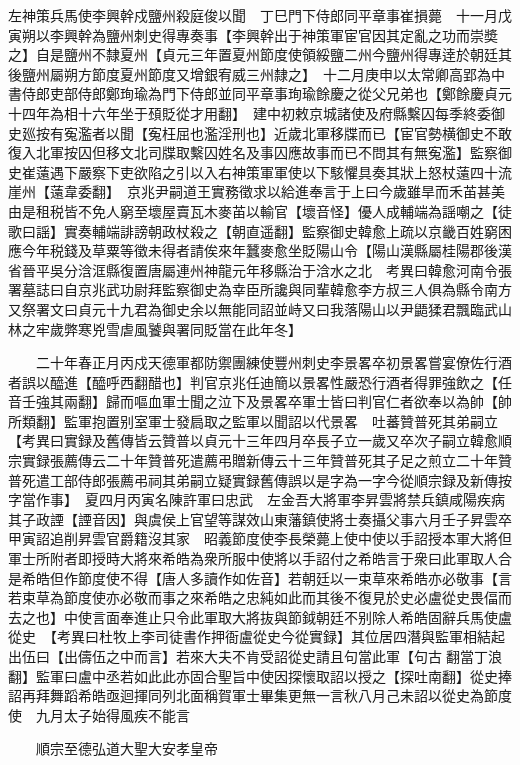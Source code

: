 左神策兵馬使李興幹戍鹽州殺庭俊以聞　丁巳門下侍郎同平章事崔損薨　十一月戊寅朔以李興幹為鹽州刺史得專奏事【李興幹出于神策軍宦官因其定亂之功而崇奬之】自是鹽州不隸夏州【貞元三年置夏州節度使領綏鹽二州今鹽州得專逹於朝廷其後鹽州屬朔方節度夏州節度又增銀宥威三州隸之】　十二月庚申以太常卿高郢為中書侍郎吏部侍郎鄭珣瑜為門下侍郎並同平章事珣瑜餘慶之從父兄弟也【鄭餘慶貞元十四年為相十六年坐于䪹貶從才用翻】　建中初敕京城諸使及府縣繫囚每季終委御史廵按有寃濫者以聞【寃枉屈也濫淫刑也】近歲北軍移牒而已【宦官勢横御史不敢復入北軍按囚但移文北司牒取繫囚姓名及事囚應故事而已不問其有無寃濫】監察御史崔薳遇下嚴察下吏欲陷之引以入右神策軍軍使以下駭懼具奏其狀上怒杖薳四十流崖州【薳韋委翻】　京兆尹嗣道王實務徵求以給進奉言于上曰今歲雖旱而禾苖甚美由是租税皆不免人窮至壞屋賣瓦木麥苖以輸官【壞音怪】優人成輔端為謡嘲之【徒歌曰謡】實奏輔端誹謗朝政杖殺之【朝直遥翻】監察御史韓愈上疏以京畿百姓窮困應今年税錢及草粟等徵未得者請俟來年蠶麥愈坐貶陽山令【陽山漢縣屬桂陽郡後漢省晉平吳分浛洭縣復置唐屬連州神龍元年移縣治于浛水之北　考異曰韓愈河南令張署墓誌曰自京兆武功尉拜監察御史為幸臣所讒與同輩韓愈李方叔三人俱為縣令南方又祭署文曰貞元十九君為御史余以無能同詔並峙又曰我落陽山以尹鼯猱君飄臨武山林之牢歲弊寒兇雪虐風饕與署同貶當在此年冬】

　　二十年春正月丙戍天德軍都防禦團練使豐州刺史李景畧卒初景畧嘗宴僚佐行酒者誤以醯進【醯呼西翻醋也】判官京兆任迪簡以景畧性嚴恐行酒者得罪強飲之【任音壬強其兩翻】歸而嘔血軍士聞之泣下及景畧卒軍士皆曰判官仁者欲奉以為帥【帥所類翻】監軍抱置别室軍士發扃取之監軍以聞詔以代景畧　吐蕃贊普死其弟嗣立　【考異曰實録及舊傳皆云贊普以貞元十三年四月卒長子立一歲又卒次子嗣立韓愈順宗實録張薦傳云二十年贊普死遣薦弔贈新傳云十三年贊普死其子足之煎立二十年贊普死遣工部侍郎張薦弔祠其弟嗣立疑實録舊傳誤以是字為一字今從順宗録及新傳按字當作事】　夏四月丙寅名陳許軍曰忠武　左金吾大將軍李昇雲將禁兵鎮咸陽疾病其子政諲【諲音因】與虞侯上官望等謀效山東藩鎮使將士奏攝父事六月壬子昇雲卒甲寅詔追削昇雲官爵籍沒其家　昭義節度使李長榮薨上使中使以手詔授本軍大將但軍士所附者即授時大將來希皓為衆所服中使將以手詔付之希皓言于衆曰此軍取人合是希皓但作節度使不得【唐人多讀作如佐音】若朝廷以一束草來希皓亦必敬事【言若束草為節度使亦必敬而事之來希皓之忠純如此而其後不復見於史必盧從史畏偪而去之也】中使言面奉進止只令此軍取大將抜與節鉞朝廷不别除人希皓固辭兵馬使盧從史　【考異曰杜牧上李司徒書作押衙盧從史今從實録】其位居四潛與監軍相結起出伍曰【出儔伍之中而言】若來大夫不肯受詔從史請且句當此軍【句古翻當丁浪翻】監軍曰盧中丞若如此此亦固合聖旨中使因探懷取詔以授之【探吐南翻】從史捧詔再拜舞蹈希皓亟迴揮同列北面稱賀軍士畢集更無一言秋八月己未詔以從史為節度使　九月太子始得風疾不能言

　　順宗至德弘道大聖大安孝皇帝

